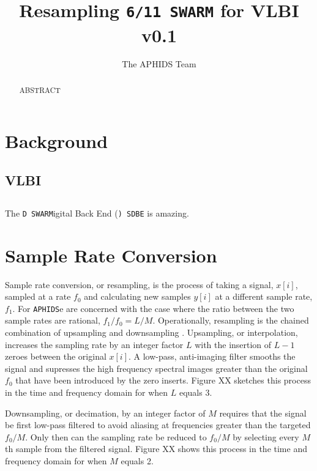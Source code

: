 \documentclass[11pt,preprint]{aastex}
\newcommand{\SWARM}[1]{\texttt{#1\,SWARM}}
\newcommand{\SDBE}[1]{\texttt{#1\,SDBE}}
\newcommand{\APHIDS}[1]{\texttt{APHIDS}}
\begin{document}
\title{Resampling \SWARM{6/11} for VLBI \\ v0.1}

\author{The APHIDS Team}

\begin{abstract}
ABSTRACT
\end{abstract}

\section{Background} \label{sec:background}
\subsection{VLBI}

\subsection{\SDBE}
The \SWARM Digital Back End (\SDBE) is amazing.

\section{Sample Rate Conversion} \label{sec:src_basics}

Sample rate conversion, or resampling, is the process of taking a signal, $x[i]$, sampled at a rate $f_0$ and 
calculating new samples $y[i]$ at a different sample rate, $f_1$.  For \APHIDS we are concerned with the case 
where the ratio between the two sample rates are rational, $f_1/f_0 = L/M$.  Operationally, resampling is the 
chained combination of upsampling and downsampling \citep{oppenheim10,lyons11}.  Upsampling, or interpolation, 
increases the sampling rate 
by an integer factor $L$ with the insertion of $L-1$ zeroes between the original $x[i]$.  A low-pass, 
anti-imaging filter smooths the signal and supresses the high frequency spectral images greater than the original 
$f_0$ that have been introduced by the zero inserts.  Figure XX sketches this process in the time and frequency 
domain for when $L$ equals 3. 

Downsampling, or decimation, by an integer factor of $M$ requires that the signal be first low-pass filtered to 
avoid aliasing 
at frequencies greater than the targeted $f_0/M$.  Only then can the sampling rate be reduced to $f_0/M$ by 
selecting every $M$th sample from the filtered signal.  Figure XX shows this process in the time and frequency 
domain for when $M$ equals 2.
\end{document}
